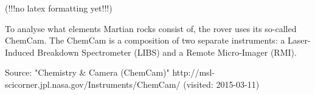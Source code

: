 (!!!no latex formatting yet!!!)

To analyse what elements Martian rocks consist of, the rover uses its so-called ChemCam. The ChemCam is a composition of two separate instruments: a Laser-Induced Breakdown Spectrometer (LIBS) and a Remote Micro-Imager (RMI).

Source:
"Chemistry & Camera (ChemCam)"
http://msl-scicorner.jpl.nasa.gov/Instruments/ChemCam/ (visited: 2015-03-11)